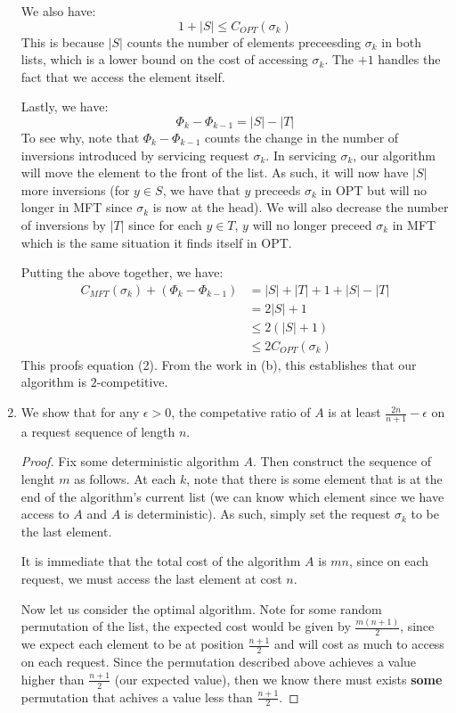 \documentclass[12pt]{exam}
\begin{document}
\begin{questions}
\begin{solution}
\begin{enumerate}[label=(\alph*)]
      We also have:
      \[
        1 + |S| \leq C_{OPT}(\sigma_k)
      \]
      This is because $|S|$ counts the number of elements preceesding $\sigma_k$ in both lists, which is a lower bound on the cost of accessing $\sigma_k$. The $+1$ handles the fact that we access the element itself.

      Lastly, we have:
      \[
        \Phi_k - \Phi_{k-1} = |S| - |T|
      \]
      To see why, note that $\Phi_k - \Phi_{k-1}$ counts the change in the number of inversions introduced by servicing request $\sigma_k$. In servicing $\sigma_k$, our algorithm will move the element to the front of the list. As such, it will now have $|S|$ more inversions (for $y \in S$, we have that $y$ preceeds $\sigma_k$ in OPT but will no longer in MFT since $\sigma_k$ is now at the head). We will also decrease the number of inversions by $|T|$ since for each $y \in T$, $y$ will no longer preceed $\sigma_k$ in MFT which is the same situation it finds itself in OPT.

      Putting the above together, we have:
      \begin{align*}  
        C_{MFT}(\sigma_k) + (\Phi_k - \Phi_{k-1}) &= |S| + |T| + 1 + |S| - |T| \tag{See above} \\
        &= 2|S| + 1 \\
        &\leq 2(|S| + 1) \\
        &\leq 2C_{OPT}(\sigma_k) \tag{See above}
      \end{align*}
      This proofs equation (2). From the work in (b), this establishes that our algorithm is $2$-competitive. 

    \item
      We show that for any $\epsilon > 0$, the competative ratio of $A$ is at least $\frac{2n}{n+1} - \epsilon$ on a request sequence of length $n$.
      \begin{proof}
        Fix some deterministic algorithm $A$. Then construct the sequence of lenght $m$ as follows. At each $k$, note that there is some element that is at the end of the algorithm's current list (we can know which element since we have access to $A$ and $A$ is deterministic). As such, simply set the request $\sigma_k$ to be the last element. 

        It is immediate that the total cost of the algorithm $A$ is $mn$, since on each request, we must access the last element at cost $n$.

        Now let us consider the optimal algorithm. Note for some random permutation of the list, the expected cost would be given by $\frac{m(n + 1)}{2}$, since we expect each element to be at position $\frac{n+1}{2}$ and will cost as much to access on each request. Since the permutation described above achieves a value higher than $\frac{n+1}{2}$ (our expected value), then we know there must exists \textbf{some} permutation that achives a value less than $\frac{n+1}{2}$.


\end{proof}
\end{enumerate}
\end{solution}
\end{questions}
\end{document}

